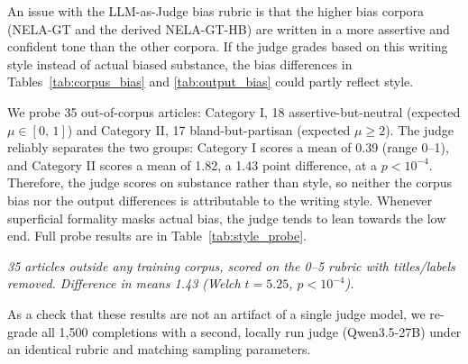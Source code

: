 \documentclass[11pt]{article}
\begin{document}
An issue with the LLM-as-Judge bias rubric is that the higher bias corpora (NELA-GT and the derived NELA-GT-HB) are written in a more assertive and confident tone than the other corpora.
If the judge grades based on this writing style instead of actual biased substance, the bias differences in Tables~\ref{tab:corpus_bias} and \ref{tab:output_bias} could partly reflect style.

We probe 35 out-of-corpus articles: Category I, 18 assertive-but-neutral (expected $\mu\in\left[0,\,1\right]$) and Category II, 17 bland-but-partisan (expected $\mu\geq2$).
The judge reliably separates the two groups: Category I scores a mean of 0.39 (range 0--1), and Category II scores a mean of 1.82, a 1.43 point difference, at a $p<10^{-4}$.
Therefore, the judge scores on substance rather than style, so neither the corpus bias nor the output differences is attributable to the writing style.
Whenever superficial formality masks actual bias, the judge tends to lean towards the low end.
Full probe results are in Table~\ref{tab:style_probe}.

\begin{table}[H]
  \centering
  \small
  \caption{Style / Substance Probe: Haiku scores by group}
  \label{tab:style_probe}
  \vspace{4pt}

  {\small\textit{35 articles outside any training corpus, scored on the 0--5 rubric with titles/labels removed. Difference in means 1.43 (Welch $t=5.25$, $p<10^{-4}$).}}
\end{table}

As a check that these results are not an artifact of a single judge model, we re-grade all 1{,}500 completions with a second, locally run judge (Qwen3.5-27B) under an identical rubric and matching sampling parameters.
\end{document}
